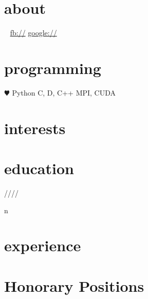 \documentclass[]{fancy-cv}
\begin{document}
\header{\MakeLowercase\myfirstname}{\MakeLowercase\mylastname}
       {\MakeLowercase\mytitle}

\begin{aside}
  \section{about}
    \myaddress
    \mycity
    ~
    \href{mailto:\myemail}{\myemail}
    \href{\mywebsite}{\mywebsite}
    \href{http://facebook.com/\myfb}{fb://\myfb}
    \href{http://plug.google.com/\mygp}{google://\mygp}
  \section{programming}
    {\color{red} $\varheartsuit$} Python
    C, D, C++
    MPI, CUDA
\end{aside}

\section{interests}
\MakeLowercase\interests

\section{education}
\label{sec:education}

\begin{entrylist}
   \year/\degree/\school/\city/\subtitle in \education {
    \entry{\year}{\degree}{\school}{\subtitle}
  }
\end{entrylist}

\section{experience}
\label{sec:experience}

\section{Honorary Positions}
\label{sec:honorary-positions}

\end{document}

